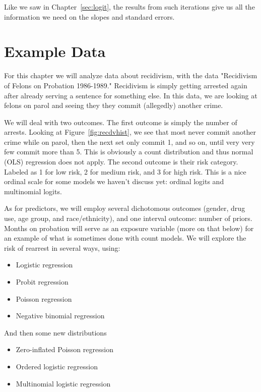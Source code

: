 Like we saw in Chapter~\ref{sec:logit}, the results from such iterations give us all the information we need on the slopes and standard errors.

\section{Example Data}

For this chapter we will analyze data about recidivism, with the data "Recidivism of Felons on Probation 1986-1989." Recidivism is simply getting arrested again after already serving a sentence for something else. In this data, we are looking at felons on parol and seeing they they commit (allegedly) another crime.

We will deal with two outcomes.  The first outcome is simply the number of arrests. Looking at Figure~\ref{fig:recdvhist}, we see that most never commit another crime while on parol, then the next set only commit 1, and so on, until very very few commit more than 5. This is obviously a count distribution and thus normal (OLS) regression does not apply. The second outcome is their risk category.  Labeled as 1 for low risk, 2 for medium risk, and 3 for high risk. This is a nice ordinal scale for some models we haven't discuss yet: ordinal logits and multinomial logits.

As for predictors, we will employ several dichotomous outcomes (gender, drug use, age group, and race/ethnicity), and one interval outcome: number of priors. Months on probation will serve as an exposure variable (more on that below) for an example of what is sometimes done with count models.  We will explore the risk of rearrest in several ways, using:
\begin{itemize}
\item{Logistic regression}
\item{Probit regression}
\item{Poisson regression}
\item{Negative binomial regression}
\end{itemize}
And then some new distributions
\begin{itemize}
\item{Zero-inflated Poisson regression}
\item{Ordered logistic regression}
\item{Multinomial logistic regression}
\end{itemize}


